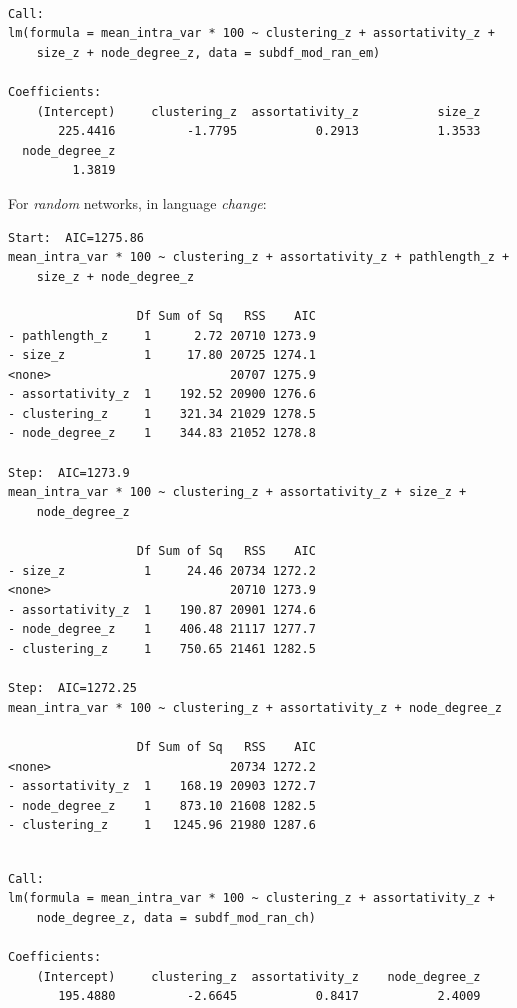 \documentclass[
]{article}
\begin{document}
\begin{verbatim}

Call:
lm(formula = mean_intra_var * 100 ~ clustering_z + assortativity_z + 
    size_z + node_degree_z, data = subdf_mod_ran_em)

Coefficients:
    (Intercept)     clustering_z  assortativity_z           size_z  
       225.4416          -1.7795           0.2913           1.3533  
  node_degree_z  
         1.3819  
\end{verbatim}

For \emph{random} networks, in language \emph{change}:

\begin{verbatim}
Start:  AIC=1275.86
mean_intra_var * 100 ~ clustering_z + assortativity_z + pathlength_z + 
    size_z + node_degree_z

                  Df Sum of Sq   RSS    AIC
- pathlength_z     1      2.72 20710 1273.9
- size_z           1     17.80 20725 1274.1
<none>                         20707 1275.9
- assortativity_z  1    192.52 20900 1276.6
- clustering_z     1    321.34 21029 1278.5
- node_degree_z    1    344.83 21052 1278.8

Step:  AIC=1273.9
mean_intra_var * 100 ~ clustering_z + assortativity_z + size_z + 
    node_degree_z

                  Df Sum of Sq   RSS    AIC
- size_z           1     24.46 20734 1272.2
<none>                         20710 1273.9
- assortativity_z  1    190.87 20901 1274.6
- node_degree_z    1    406.48 21117 1277.7
- clustering_z     1    750.65 21461 1282.5

Step:  AIC=1272.25
mean_intra_var * 100 ~ clustering_z + assortativity_z + node_degree_z

                  Df Sum of Sq   RSS    AIC
<none>                         20734 1272.2
- assortativity_z  1    168.19 20903 1272.7
- node_degree_z    1    873.10 21608 1282.5
- clustering_z     1   1245.96 21980 1287.6
\end{verbatim}

\begin{verbatim}

Call:
lm(formula = mean_intra_var * 100 ~ clustering_z + assortativity_z + 
    node_degree_z, data = subdf_mod_ran_ch)

Coefficients:
    (Intercept)     clustering_z  assortativity_z    node_degree_z  
       195.4880          -2.6645           0.8417           2.4009  
\end{verbatim}
\end{document}
